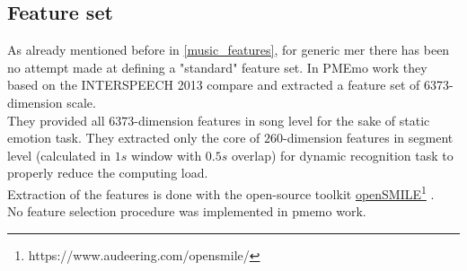 \subsection{Feature set}
As already mentioned before in \ref{music_features}, for generic \gls{mer} there has been no attempt made at defining a "standard" feature set. In PMEmo work \cite{zhang2018pmemo} they based on the INTERSPEECH 2013 \gls{compare} \cite{schuller2013interspeech} and extracted a feature set of 6373-dimension scale.
\\
They provided all $6373$-dimension features in song level for the sake of static emotion task. They extracted only the core of $260$-dimension features in segment level (calculated in $1s$ window with $0.5s$ overlap) for dynamic recognition task to properly reduce the computing load.
\\
Extraction of the features is done with the open-source toolkit \href{https://www.audeering.com/opensmile/}{openSMILE}\footnote{https://www.audeering.com/opensmile/} \cite{eyben2013recent}.
\\
No feature selection procedure was implemented in \gls{pmemo} work.

